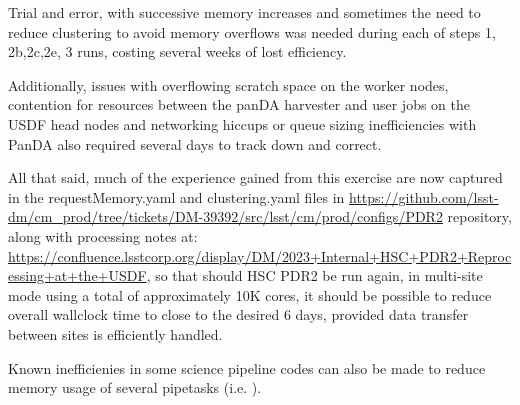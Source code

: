 Trial and error, with successive memory increases and sometimes the need to
reduce clustering to avoid memory overflows was needed during each of
steps 1, 2b,2c,2e, 3 runs, costing several weeks of lost efficiency.

Additionally, issues with overflowing scratch space on the worker nodes,
contention for resources between the panDA harvester and user jobs on the 
USDF head nodes and networking hiccups or queue sizing inefficiencies 
with PanDA also required several days to track down and correct.

All that said, much of the experience gained from this exercise are
now captured in the requestMemory.yaml and clustering.yaml files
in \url{https://github.com/lsst-dm/cm_prod/tree/tickets/DM-39392/src/lsst/cm/prod/configs/PDR2} repository, along with processing notes at:
\url{https://confluence.lsstcorp.org/display/DM/2023+Internal+HSC+PDR2+Reprocessing+at+the+USDF}, so that should HSC PDR2 be run again, in multi-site 
mode using a total of approximately 10K cores, it should be 
possible to reduce overall wallclock time to close to the desired 6 days,
provided data transfer between sites is efficiently handled.

Known inefficienies in some science pipeline codes can also be made to
reduce memory usage of several pipetasks (i.e. ).




